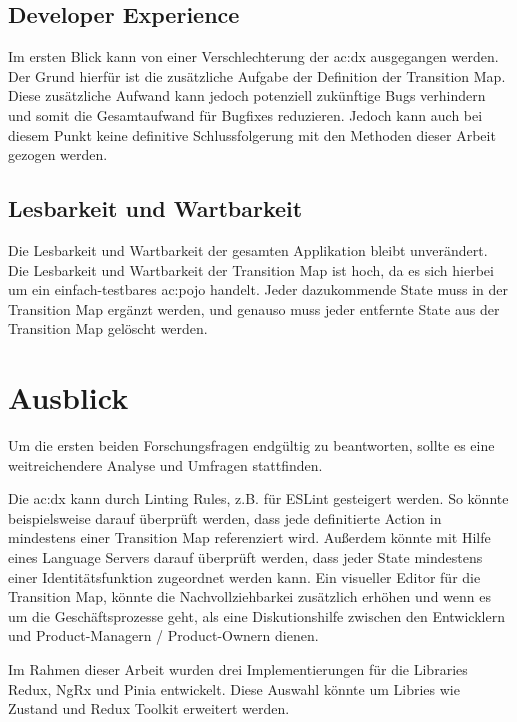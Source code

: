 \subsection{Developer Experience}

Im ersten Blick kann von einer Verschlechterung der \acrshort{ac:dx} ausgegangen werden. Der Grund hierfür ist die zusätzliche Aufgabe der Definition der Transition Map. Diese zusätzliche Aufwand kann jedoch potenziell zukünftige Bugs verhindern und somit die Gesamtaufwand für Bugfixes reduzieren. Jedoch kann auch bei diesem Punkt keine definitive Schlussfolgerung mit den Methoden dieser Arbeit gezogen werden.

\subsection{Lesbarkeit und Wartbarkeit}

Die Lesbarkeit und Wartbarkeit der gesamten Applikation bleibt unverändert. Die Lesbarkeit und Wartbarkeit der Transition Map ist hoch, da es sich hierbei um ein einfach-testbares \acrshort{ac:pojo} handelt. Jeder dazukommende State muss in der Transition Map ergänzt werden, und genauso muss jeder entfernte State aus der Transition Map gelöscht werden.

\section{Ausblick}

Um die ersten beiden Forschungsfragen endgültig zu beantworten, sollte es eine weitreichendere Analyse und Umfragen stattfinden.

Die \acrshort{ac:dx} kann durch Linting Rules, z.B. für ESLint gesteigert werden. So könnte beispielsweise darauf überprüft werden, dass jede definitierte Action in mindestens einer Transition Map referenziert wird. Außerdem könnte mit Hilfe eines Language Servers darauf überprüft werden, dass jeder State mindestens einer Identitätsfunktion zugeordnet werden kann. Ein visueller Editor für die Transition Map, könnte die Nachvollziehbarkei zusätzlich erhöhen und wenn es um die Geschäftsprozesse geht, als eine Diskutionshilfe zwischen den Entwicklern und Product-Managern / Product-Ownern dienen.

Im Rahmen dieser Arbeit wurden drei Implementierungen für die Libraries Redux, NgRx und Pinia entwickelt. Diese Auswahl könnte um Libries wie Zustand und Redux Toolkit erweitert werden.